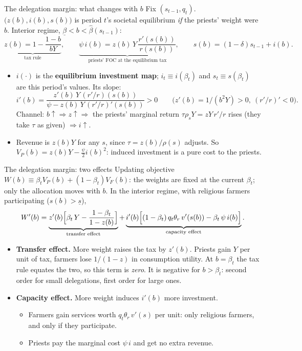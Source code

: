 \documentclass[11pt,aspectratio=169]{beamer}
\begin{document}
\begin{frame}{The delegation margin: what changes with $b$}
Fix $(s_{t-1},q_t)$. $\bigl(z(b),i(b),s(b)\bigr)$ is period $t$'s societal equilibrium \emph{if}
the priests' weight were $b$. Interior regime, $\underline\beta<b<\hat\beta(s_{t-1})$:
\[
\underbrace{z(b)=1-\frac{1-b}{bY}}_{\text{tax rule}},\qquad
\underbrace{\psi\,i(b)=z(b)\,Y\,\frac{r'(s(b))}{r(s(b))}}_{\text{priests' FOC at the equilibrium tax}},\qquad
s(b)=(1-\delta)s_{t-1}+i(b).
\]
\begin{itemize}
\item $i(\cdot)$ is the \textbf{equilibrium investment map}; $i_t\equiv i(\beta_t)$ and
$s_t\equiv s(\beta_t)$ are this period's values. Its slope:
\[
i'(b)=\frac{z'(b)\,Y\,(r'/r)(s(b))}{\psi-z(b)\,Y\,(r'/r)'(s(b))}>0
\qquad\bigl(z'(b)=1/(b^2Y)>0,\ (r'/r)'<0\bigr).
\]
Channel: $b\uparrow\Rightarrow z\uparrow\Rightarrow$ the priests' marginal return
$\tau\rho_sY=zY\,r'/r$ rises (they take $\tau$ as given) $\Rightarrow i\uparrow$.
\item Revenue is $z(b)Y$ for any $s$, since $\tau=z(b)/\rho(s)$ adjusts. So
$V_P(b)=z(b)Y-\tfrac\psi2 i(b)^2$: induced investment is a pure cost to the priests.
\end{itemize}
\end{frame}

\begin{frame}{The delegation margin: two effects}
Updating objective $W(b)\equiv\beta_tV_P(b)+(1-\beta_t)V_F(b)$: the weights are fixed at the
current $\beta_t$; only the allocation moves with $b$. In the interior regime, with religious
farmers participating ($s(b)>\underline s$),
\[
W'(b)=
\underbrace{z'(b)\Bigl[\beta_t\,Y-\frac{1-\beta_t}{1-z(b)}\Bigr]}_{\text{transfer effect}}
+\underbrace{i'(b)\Bigl[(1-\beta_t)\,q_t\theta_r\,v'(s(b))-\beta_t\,\psi\,i(b)\Bigr]}_{\text{capacity effect}} .
\]
\begin{itemize}
\item \textbf{Transfer effect.} More weight raises the tax by $z'(b)$. Priests gain $Y$ per unit
of tax, farmers lose $1/(1-z)$ in consumption utility. At $b=\beta_t$ the tax rule equates the
two, so this term is \emph{zero}. It is negative for $b>\beta_t$: second order for small
delegations, first order for large ones.
\item \textbf{Capacity effect.} More weight induces $i'(b)$ more investment.
\begin{itemize}
\item Farmers gain services worth $q_t\theta_r\,v'(s)$ per unit: only religious farmers, and
only if they participate.
\item Priests pay the marginal cost $\psi\,i$ and get no extra revenue.
\end{itemize}
\end{itemize}
\end{frame}
\end{document}
